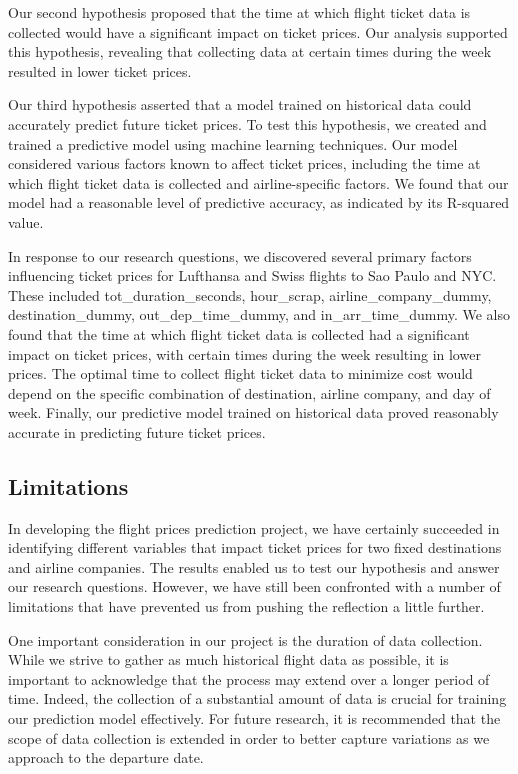 Our second hypothesis proposed that the time at which flight ticket data is collected would have a significant impact on ticket prices.
Our analysis supported this hypothesis, revealing that collecting data at certain times during the week resulted in lower ticket prices.

Our third hypothesis asserted that a model trained on historical data could accurately predict future ticket prices.
To test this hypothesis, we created and trained a predictive model using machine learning techniques.
Our model considered various factors known to affect ticket prices, including the time at which flight ticket data is collected and airline-specific factors.
We found that our model had a reasonable level of predictive accuracy, as indicated by its R-squared value.

In response to our research questions, we discovered several primary factors influencing ticket prices for Lufthansa and Swiss flights to Sao Paulo and NYC.
These included tot\_duration\_seconds, hour\_scrap, airline\_company\_dummy, destination\_dummy, out\_dep\_time\_dummy, and in\_arr\_time\_dummy.
We also found that the time at which flight ticket data is collected had a significant impact on ticket prices, with certain times during the week resulting in lower prices.
The optimal time to collect flight ticket data to minimize cost would depend on the specific combination of destination, airline company, and day of week.
Finally, our predictive model trained on historical data proved reasonably accurate in predicting future ticket prices.

\subsection{Limitations}
\label{sec:limitation}
In developing the flight prices prediction project, we have certainly succeeded in identifying different variables that impact ticket prices for two fixed destinations and airline companies.
The results enabled us to test our hypothesis and answer our research questions. 
However, we have still been confronted with a number of limitations that have prevented us from pushing the reflection a little further.

One important consideration in our project is the duration of data collection. While we strive to gather as much historical flight data as possible, it is important to acknowledge that the process may extend over a longer period of time.
Indeed, the collection of a substantial amount of data is crucial for training our prediction model effectively.
For future research, it is recommended that the scope of data collection is extended in order to better capture variations as we approach to the departure date.


